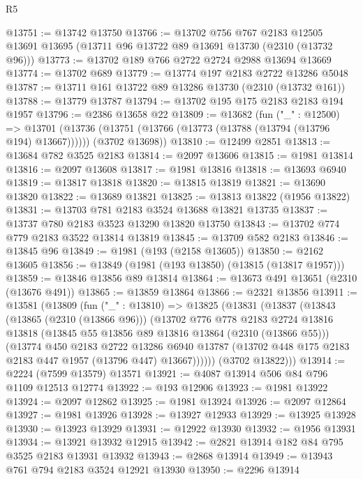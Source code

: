 \begin{lexlean}{R5}
\begin{coremodule}
@13751 := @13742 @13750
@13766 := @13702
    @756
    @767
    @2183
    @12505
    @13691
    @13695
    (@13711 @96 @13722 @89 @13691 @13730 (@2310 (@13732 @96)))
@13773 := @13702 @189 @766 @2722 @2724 @2988 @13694 @13669
@13774 := @13702 @689
@13779 := @13774 @197 @2183 @2722 @13286 @5048
@13787 := @13711 @161 @13722 @89 @13286 @13730 (@2310 (@13732 @161))
@13788 := @13779 @13787
@13794 := @13702 @195 @175 @2183 @2183 @194 @1957
@13796 := @2386 @13658 @22
@13809 := @13682
    (fun ("_" : @12500) =>
    @13701
      (@13736 (@13751 (@13766 (@13773 (@13788 (@13794 (@13796 @194) @13667))))))
      (@3702 @13698))
@13810 := @12499 @2851
@13813 := @13684 @782 @3525 @2183
@13814 := @2097 @13606
@13815 := @1981 @13814
@13816 := @2097 @13608
@13817 := @1981 @13816
@13818 := @13693 @6940
@13819 := @13817 @13818
@13820 := @13815 @13819
@13821 := @13690 @13820
@13822 := @13689 @13821
@13825 := @13813 @13822 (@1956 @13822)
@13831 := @13703 @781 @2183 @3524 @13688 @13821 @13735
@13837 := @13737 @780 @2183 @3523 @13290 @13820 @13750
@13843 := @13702 @774 @779 @2183 @3522 @13814 @13819
@13845 := @13709 @582 @2183
@13846 := @13845 @96
@13849 := @1981 (@193 (@2158 @13605))
@13850 := @2162 @13605
@13856 := @13849 (@1981 (@193 @13850) (@13815 (@13817 @1957)))
@13859 := @13846 @13856 @89 @13814
@13864 := @13673 @491 @13651 (@2310 (@13676 @491))
@13865 := @13859 @13864
@13866 := @2321 @13856
@13911 := @13581
    (@13809
      (fun ("_" : @13810) =>
      @13825
        (@13831
          (@13837
            (@13843
              (@13865 (@2310 (@13866 @96)))
              (@13702
                @776
                @778
                @2183
                @2724
                @13816
                @13818
                (@13845 @55 @13856 @89 @13816 @13864 (@2310 (@13866 @55)))
                (@13774
                  @450
                  @2183
                  @2722
                  @13286
                  @6940
                  @13787
                  (@13702 @448 @175 @2183 @2183 @447 @1957 (@13796 @447) @13667))))))
        (@3702 @13822)))
@13914 := @2224 (@7599 @13579) @13571
@13921 := @4087 @13914 @506 @84 @796 @1109 @12513 @12774
@13922 := @193 @12906
@13923 := @1981 @13922
@13924 := @2097 @12862
@13925 := @1981 @13924
@13926 := @2097 @12864
@13927 := @1981 @13926
@13928 := @13927 @12933
@13929 := @13925 @13928
@13930 := @13923 @13929
@13931 := @12922 @13930
@13932 := @1956 @13931
@13934 := @13921 @13932 @12915
@13942 := @2821 @13914 @182 @84 @795 @3525 @2183 @13931 @13932
@13943 := @2868 @13914
@13949 := @13943 @761 @794 @2183 @3524 @12921 @13930
@13950 := @2296 @13914

\end{coremodule}
\end{lexlean}
